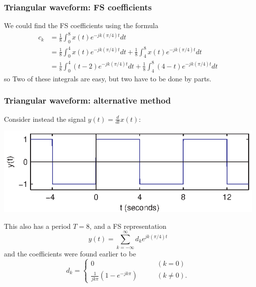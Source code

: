 \documentclass[10pt]{beamer}
\begin{document}
\begin{frame}
\frametitle{Triangular waveform:  FS coefficients}

We could find the FS coefficients using the formula
\begin{align*}
	c_k &= \frac{1}{8} \int_0^8 x(t) e^{-j k (\pi/4) t} dt \\
	&= \frac{1}{8} \int_0^4 x(t) e^{-j k (\pi/4) t} dt
	+ \frac{1}{8} \int_4^8 x(t) e^{-j k (\pi/4) t} dt \\
	&= \frac{1}{8} \int_0^4 (t-2) e^{-j k (\pi/4) t} dt
	+ \frac{1}{8} \int_4^8 (4-t) e^{-j k (\pi/4) t} dt
\end{align*}
so
Two of these integrals are easy, but two have to be done by parts.

\end{frame}

\begin{frame}
\frametitle{Triangular waveform:  alternative method}
Consider instead the signal $y(t) = \frac{d}{dt} x(t)$:
\begin{center}
  \includegraphics{fs_add_fig02}
\end{center}
This also has a period $T=8$, and a FS representation 
\begin{equation*}
  y(t) = \sum_{k=-\infty}^\infty d_k e^{j k (\pi/4) t}
\end{equation*}
and the coefficients were found earlier to be
\begin{equation*}
  d_k = \begin{cases}
  0 \qquad & (k=0) \\
  \frac{1}{j k \pi} (1 - e^{-j k \pi}) \qquad & (k \neq 0).
  \end{cases}
\end{equation*}
\end{frame}
\end{document}
